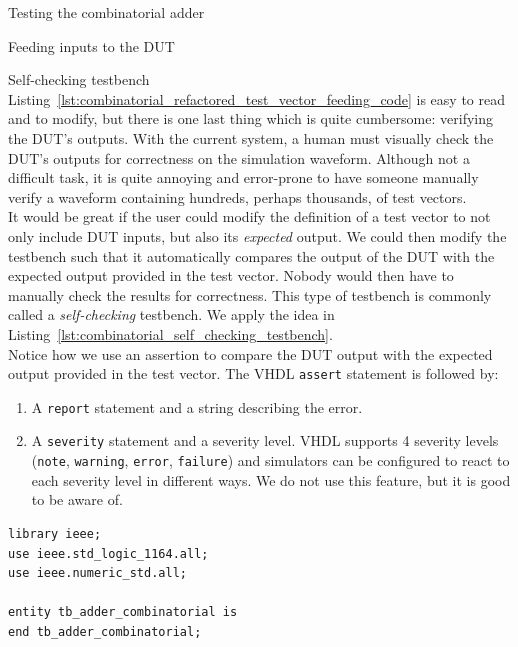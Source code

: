 \documentclass[lab]{course}
\begin{document}
\begin{section}{Testing the combinatorial adder}
\begin{subsection}{Feeding inputs to the DUT}
        \newpage

        \begin{subsubsection}{Self-checking testbench}
            Listing~\ref{lst:combinatorial_refactored_test_vector_feeding_code} is easy to read and to modify, but there is one last thing which is quite cumbersome: verifying the DUT's outputs. With the current system, a human must visually check the DUT's outputs for correctness on the simulation waveform. Although not a difficult task, it is quite annoying and error-prone to have someone manually verify a waveform containing hundreds, perhaps thousands, of test vectors. \\

            It would be great if the user could modify the definition of a test vector to not only include DUT inputs, but also its \emph{expected} output. We could then modify the testbench such that it automatically compares the output of the DUT with the expected output provided in the test vector. Nobody would then have to manually check the results for correctness. This type of testbench is commonly called a \emph{self-checking} testbench. We apply the idea in Listing~\ref{lst:combinatorial_self_checking_testbench}. \\

            Notice how we use an assertion to compare the DUT output with the expected output provided in the test vector. The VHDL \verb+assert+ statement is followed by:

            \begin{enumerate}
                \item A \verb+report+ statement and a string describing the error.
                \item A \verb+severity+ statement and a severity level. VHDL supports 4 severity levels (\verb+note+, \verb+warning+, \verb+error+, \verb+failure+) and simulators can be configured to react to each severity level in different ways. We do not use this feature, but it is good to be aware of.
            \end{enumerate}

            \begin{lstlisting}[caption={Self-checking testbench: updated \texttt{check\_add} procedure to automatically compare DUT output against expected output provided in test vector}, label={lst:combinatorial_self_checking_testbench}]
library ieee;
use ieee.std_logic_1164.all;
use ieee.numeric_std.all;

entity tb_adder_combinatorial is
end tb_adder_combinatorial;


\end{lstlisting}
\end{subsubsection}
\end{subsection}
\end{section}
\end{document}
